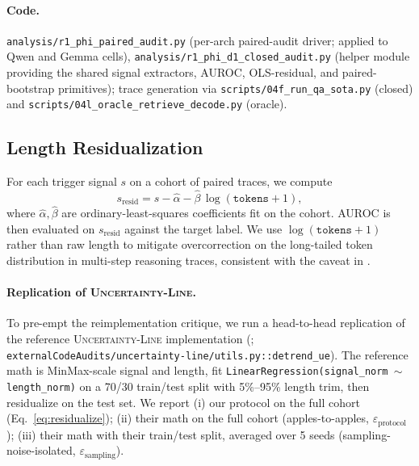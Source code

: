\documentclass[11pt]{article}
\begin{document}
\paragraph{Code.}
\texttt{analysis/r1\_phi\_paired\_audit.py} (per-arch paired-audit driver;
applied to Qwen and Gemma cells),
\texttt{analysis/r1\_phi\_d1\_closed\_audit.py} (helper module providing
the shared signal extractors, AUROC, OLS-residual, and paired-bootstrap
primitives);
trace generation via \texttt{scripts/04f\_run\_qa\_sota.py} (closed) and
\texttt{scripts/04l\_oracle\_retrieve\_decode.py} (oracle).

\subsection{Length Residualization}
\label{sec:methods-residualization}

For each trigger signal $s$ on a cohort of paired traces, we compute
\begin{equation}
s_{\text{resid}} = s - \hat{\alpha} - \hat{\beta}\,\log(\texttt{tokens} + 1),
\label{eq:residualize}
\end{equation}
where $\hat{\alpha}, \hat{\beta}$ are ordinary-least-squares coefficients fit
on the cohort. AUROC is then evaluated on $s_{\text{resid}}$ against the
target label. We use $\log(\texttt{tokens} + 1)$ rather than raw length to mitigate
overcorrection on the long-tailed token distribution in multi-step reasoning
traces, consistent with the caveat in
\citep[\S3]{Vashurin_UncertaintyLineLengthInvariant}.

\paragraph{Replication of \textsc{Uncertainty-Line}.}
To pre-empt the reimplementation critique, we run a head-to-head replication
of the reference \textsc{Uncertainty-Line} implementation
(\citealp{Vashurin_UncertaintyLineLengthInvariant};
\texttt{externalCodeAudits/uncertainty-line/utils.py::detrend\_ue}). The
reference math is MinMax-scale signal and length, fit
\texttt{LinearRegression(signal\_norm $\sim$ length\_norm)} on a 70/30
train/test split with 5\%--95\% length trim, then residualize on the test set.
We report (i) our protocol on the full cohort (Eq.~\ref{eq:residualize});
(ii) their math on the full cohort (apples-to-apples,
$\varepsilon_{\text{protocol}}$); (iii) their math with their train/test
split, averaged over 5 seeds (sampling-noise-isolated,
$\varepsilon_{\text{sampling}}$).
\end{document}

